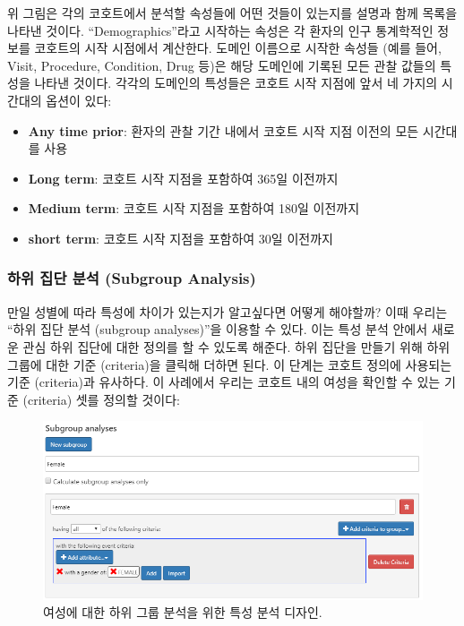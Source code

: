 \documentclass[11pt]{book}
\theoremstyle{definition}
\theoremstyle{definition}
\theoremstyle{definition}
\theoremstyle{remark}
\begin{document}
위 그림은 각의 코호트에서 분석할 속성들에 어떤 것들이 있는지를 설명과
함께 목록을 나타낸 것이다. ``Demographics''라고 시작하는 속성은 각
환자의 인구 통계학적인 정보를 코호트의 시작 시점에서 계산한다. 도메인
이름으로 시작한 속성들 (예를 들어, Visit, Procedure, Condition, Drug
등)은 해당 도메인에 기록된 모든 관찰 값들의 특성을 나타낸 것이다. 각각의
도메인의 특성들은 코호트 시작 지점에 앞서 네 가지의 시간대의 옵션이
있다:

\begin{itemize}
\item
  \textbf{Any time prior}: 환자의 관찰 기간 내에서 코호트 시작 지점
  이전의 모든 시간대를 사용
\item
  \textbf{Long term}: 코호트 시작 지점을 포함하여 365일 이전까지
\item
  \textbf{Medium term}: 코호트 시작 지점을 포함하여 180일 이전까지
\item
  \textbf{short term}: 코호트 시작 지점을 포함하여 30일 이전까지
\end{itemize}

\subsubsection*{하위 집단 분석 (Subgroup
Analysis)}\label{---subgroup-analysis}

만일 성별에 따라 특성에 차이가 있는지가 알고싶다면 어떻게 해야할까? 이때
우리는 ``하위 집단 분석 (subgroup analyses)''을 이용할 수 있다. 이는
특성 분석 안에서 새로운 관심 하위 집단에 대한 정의를 할 수 있도록
해준다. 하위 집단을 만들기 위해 하위 그룹에 대한 기준 (criteria)을
클릭해 더하면 된다. 이 단계는 코호트 정의에 사용되는 기준 (criteria)과
유사하다. 이 사례에서 우리는 코호트 내의 여성을 확인할 수 있는 기준
(criteria) 셋를 정의할 것이다:

\begin{figure}

{\centering \includegraphics[width=1\linewidth]{images/Characterization/atlasCharacterizationSubgroup} 

}

\caption{여성에 대한 하위 그룹 분석을 위한 특성 분석 디자인.}\label{fig:atlasCharacterizationSubgroup}
\end{figure}
\end{document}
